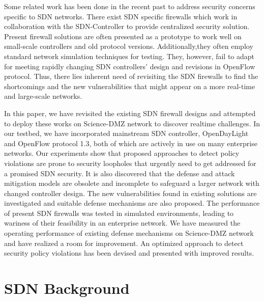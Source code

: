 Some related work has been done in the recent past to address security concerns specific to SDN networks. There exist SDN specific firewalls
which work in collaboration with the SDN-Controller to provide centralized security solution. Present firewall solutions are often presented as a prototype to work well on small-scale controllers and old protocol versions. Additionally,they often employ standard network simulation techniques for testing. They, however, fail to adapt for meeting rapidly changing SDN controllers' design and revisions in OpenFlow protocol. Thus, there lies inherent need of revisiting the SDN firewalls to find the shortcomings and the new vulnerabilities that might appear on a more real-time and large-scale networks.

In this paper, we have revisited the existing SDN firewall designs and attempted to deploy these works on Science-DMZ network to discover realtime challenges.
In our testbed, we have incorporated mainstream SDN controller, OpenDayLight and OpenFlow protocol 1.3, both of which are actively in use on many enterprise networks. Our experiments show that proposed approaches to detect policy violations are prone to security loopholes that urgently need to get addressed for a promised SDN security. It is also discovered that the defense and attack mitigation models are obsolete and incomplete to safeguard a larger network with changed controller design. The new vulnerabilities found in existing solutions are investigated and suitable defense mechanisms are also proposed. The performance of present SDN firewalls was tested in simulated environments, leading to wariness of their feasibility in an enterprise network.
We have measured the operating performance of existing defense mechanisms on Science-DMZ network and have realized a room for improvement. An optimized approach to detect security policy violations has been devised and presented with improved results.

\section{SDN Background}
